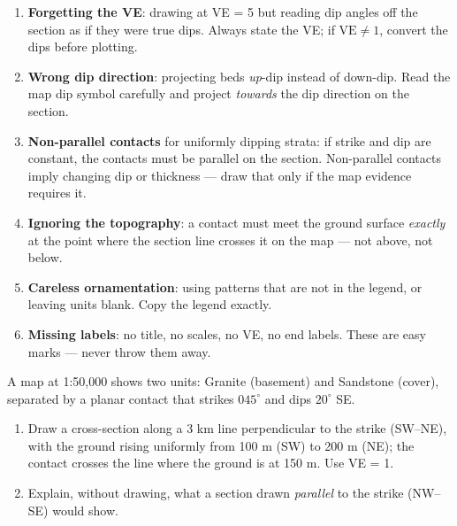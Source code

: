 \documentclass[11pt]{article}
\newcommand{\cle}[1]{{\popxbold\color{popdark}#1}}
\begin{document}
\begin{attention}
\begin{enumerate}
  \item \textbf{Forgetting the VE}: drawing at VE = 5 but reading dip angles off the section as if they were true dips. Always state the VE; if $\mathrm{VE} \neq 1$, convert the dips before plotting.
  \item \textbf{Wrong dip direction}: projecting beds \emph{up}-dip instead of down-dip. Read the map dip symbol carefully and project \emph{towards} the dip direction on the section.
  \item \textbf{Non-parallel contacts} for uniformly dipping strata: if strike and dip are constant, the contacts must be parallel on the section. Non-parallel contacts imply changing dip or thickness — draw that only if the map evidence requires it.
  \item \textbf{Ignoring the topography}: a contact must meet the ground surface \emph{exactly} at the point where the section line crosses it on the map — not above, not below.
  \item \textbf{Careless ornamentation}: using patterns that are not in the legend, or leaving units blank. Copy the legend exactly.
  \item \textbf{Missing labels}: no title, no scales, no VE, no end labels. These are easy marks — never throw them away.
\end{enumerate}
\end{attention}

\begin{exercice}
A map at 1:50,000 shows two units: \cle{Granite} (basement) and \cle{Sandstone} (cover), separated by a planar contact that strikes $045^{\circ}$ and dips $20^{\circ}$ SE.
\begin{enumerate}
  \item Draw a cross-section along a 3 km line perpendicular to the strike (SW--NE), with the ground rising uniformly from 100 m (SW) to 200 m (NE); the contact crosses the line where the ground is at 150 m. Use VE = 1.
  \item Explain, without drawing, what a section drawn \emph{parallel} to the strike (NW--SE) would show.
\end{enumerate}
\end{exercice}
\end{document}
